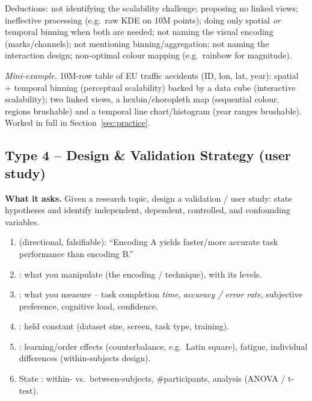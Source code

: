 \begin{pitfall}
Deductions: not identifying the scalability challenge; proposing no linked
views; ineffective processing (e.g.\ raw KDE on 10M points); doing only spatial
\emph{or} temporal binning when both are needed; not naming the visual encoding
(marks/channels); not mentioning binning/aggregation; not naming the
interaction design; non-optimal colour mapping (e.g.\ rainbow for magnitude).
\end{pitfall}

\textit{Mini-example.} 10M-row table of EU traffic accidents (ID, lon, lat,
year): spatial + temporal binning (perceptual scalability) backed by a data
cube (interactive scalability); two linked views, a hexbin/choropleth map
(sequential colour, regions brushable) and a temporal line chart/histogram
(year ranges brushable). Worked in full in Section~\ref{sec:practice}.

\subsection{Type 4 -- Design \& Validation Strategy (user study)}

\textbf{What it asks.} Given a research topic, design a validation / user study:
state hypotheses and identify independent, dependent, controlled, and
confounding variables.

\begin{exambox}
\begin{enumerate}[leftmargin=1.4em]
  \item {} (directional, falsifiable): ``Encoding A yields
        faster/more accurate task performance than encoding B.''
  \item {}: what you manipulate (the encoding /
        technique), with its levels.
  \item {}: what you measure -- task completion
        \emph{time}, \emph{accuracy / error rate}, subjective preference,
        cognitive load, confidence.
  \item {}: held constant (dataset size, screen,
        task type, training).
  \item {}: learning/order effects (counterbalance, e.g.\ Latin
        square), fatigue, individual differences (within-subjects design).
  \item State : within- vs.\ between-subjects, \#participants,
        analysis (ANOVA / t-test).
\end{enumerate}
\end{exambox}

